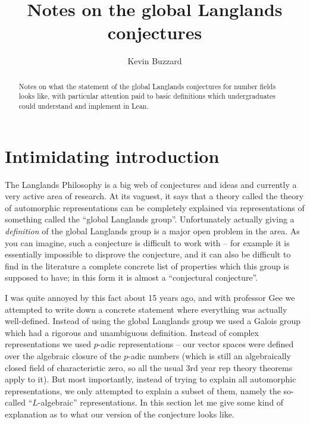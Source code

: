 \documentclass{amsart}
\begin{document}
\title{Notes on the global Langlands conjectures}
\author{Kevin Buzzard}
\address{Department of Mathematics, Imperial College London}
\begin{abstract}
  Notes on what the statement of the global Langlands conjectures for number fields looks like, with particular attention paid to basic definitions which undergraduates could understand and implement in Lean.
\end{abstract}

\maketitle

\section{Intimidating introduction}

The Langlands Philosophy is a big web of conjectures and ideas and currently a very active area of research. At its vaguest, it says that a theory called the theory of automorphic representations can be completely explained via representations of something called the ``global Langlands group''. Unfortunately actually giving a \emph{definition} of the global Langlands group is a major open problem in the area. As you can imagine, such a conjecture is difficult to work with -- for example it is essentially impossible to disprove the conjecture, and it can also be difficult to find in the literature a complete concrete list of properties which this group is supposed to have; in this form it is almost a ``conjectural conjecture''.

I was quite annoyed by this fact about 15 years ago, and with professor Gee we attempted to write down a concrete statement where everything was actually well-defined. Instead of using the global Langlands group we used a Galois group which had a rigorous and unambiguous definition. Instead of complex representations we used $p$-adic representations -- our vector spaces were defined over the algebraic closure of the $p$-adic numbers (which is still an algebraically closed field of characteristic zero, so all the usual 3rd year rep theory theorems apply to it). But most importantly, instead of trying to explain all automorphic representations, we only attempted to explain a subset of them, namely the so-called ``$L$-algebraic'' representations. In this section let me give some kind of explanation as to what our version of the conjecture looks like.
\end{document}
